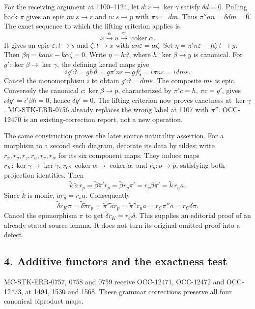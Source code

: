 \documentclass[11pt]{article}
\begin{document}
For the receiving argument at 1100--1124, let \(d:r\to\ker\gamma\) satisfy \(\delta d=0\). Pulling back \(\pi\) gives an epic \(m:s\to r\) and \(n:s\to p\) with \(\pi n=dm\). Thus \(\pi''an=\delta dm=0\). The exact sequence to which the lifting criterion applies is \[
x\xrightarrow{\alpha}u\xrightarrow{\pi''}\operatorname{coker}\alpha.
\] It gives an epic \(\varepsilon:t\to s\) and \(\zeta:t\to x\) with \(an\varepsilon=\alpha\zeta\). Set \(\eta=\pi'n\varepsilon-f\zeta:t\to y\). Then \(\beta\eta=kan\varepsilon-k\alpha\zeta=0\). Write \(\eta=h\vartheta\), where \(h:\ker\beta\to y\) is canonical. For \(g':\ker\beta\to\ker\gamma\), the defining kernel maps give \[
ig'\vartheta=gh\vartheta
=g\pi'n\varepsilon-gf\zeta
=i\pi n\varepsilon=idm\varepsilon.
\] Cancel the monomorphism \(i\) to obtain \(g'\vartheta=dm\varepsilon\). The composite \(m\varepsilon\) is epic. Conversely the canonical \(c:\ker\beta\to p\), characterized by \(\pi'c=h,\ \pi c=g'\), gives \(\iota\delta g'=\iota'\beta h=0\), hence \(\delta g'=0\). The lifting criterion now proves exactness at \(\ker\gamma\). MC-STK-ERR-0756 already replaces the wrong label at 1107 with \(\pi''\). OCC-12470 is an existing-correction report, not a new operation.

The same construction proves the later source naturality assertion. For a morphism to a second such diagram, decorate its data by tildes; write \(r_x,r_y,r_z,r_u,r_v,r_w\) for its six component maps. They induce maps \(r_K:\ker\gamma\to\ker\widetilde\gamma\), \(r_C:\operatorname{coker}\alpha\to\operatorname{coker}\widetilde\alpha\), and \(r_p:p\to\widetilde p\), satisfying both projection identities. Then \[
\widetilde k\,\widetilde a\,r_p
=\widetilde\beta\widetilde\pi' r_p
=\widetilde\beta r_y\pi'
=r_v\beta\pi'
=\widetilde k\,r_u a.
\] Since \(\widetilde k\) is monic, \(\widetilde a r_p=r_u a\). Consequently \[
\widetilde\delta r_K\pi
=\widetilde\delta\widetilde\pi r_p
=\widetilde\pi''\widetilde a r_p
=\widetilde\pi''r_u a
=r_C\pi''a=r_C\delta\pi.
\] Cancel the epimorphism \(\pi\) to get \(\widetilde\delta r_K=r_C\delta\). This supplies an editorial proof of an already stated source lemma. It does not turn its original omitted proof into a defect.

\subsection{4. Additive functors and the exactness test}\label{note-01-additive-functors-and-the-exactness-test}

MC-STK-ERR-0757, 0758 and 0759 receive OCC-12471, OCC-12472 and OCC-12473, at 1494, 1530 and 1568. These grammar corrections preserve all four canonical biproduct maps.
\end{document}
